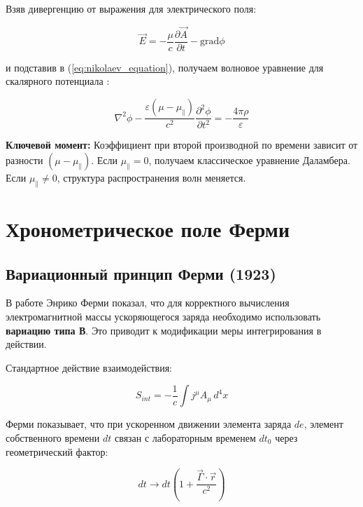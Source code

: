 \documentclass[12pt, a4paper]{article}
\begin{document}
Взяв дивергенцию от выражения для электрического поля:

\begin{equation}
\vec{E} = -\frac{\mu}{c} \frac{\partial \vec{A}}{\partial t} - \text{grad} \phi
\label{eq:electric_field_potentials}
\end{equation}

и подставив в (\ref{eq:nikolaev_equation}), получаем волновое уравнение для скалярного потенциала \cite{NikolaevLorentz}:

\begin{equation}
\nabla^2 \phi - \frac{\varepsilon(\mu - \mu_{\parallel})}{c^2} \frac{\partial^2 \phi}{\partial t^2} = -\frac{4\pi\rho}{\varepsilon}
\label{eq:wave_equation_modified}
\end{equation}

\textbf{Ключевой момент:} Коэффициент при второй производной по времени зависит от разности $(\mu - \mu_{\parallel})$. Если $\mu_{\parallel} = 0$, получаем классическое уравнение Даламбера. Если $\mu_{\parallel} \neq 0$, структура распространения волн меняется.

\section{Хронометрическое поле Ферми}

\subsection{Вариационный принцип Ферми (1923)}

В работе \cite{Fermi1923} Энрико Ферми показал, что для корректного вычисления электромагнитной массы ускоряющегося заряда необходимо использовать \textbf{вариацию типа В}. Это приводит к модификации меры интегрирования в действии.

Стандартное действие взаимодействия:

\begin{equation}
S_{int} = -\frac{1}{c} \int j^\mu A_\mu \, d^4x
\label{eq:action_standard}
\end{equation}

Ферми показывает, что при ускоренном движении элемента заряда $de$, элемент собственного времени $dt$ связан с лабораторным временем $dt_0$ через геометрический фактор:

\begin{equation}
dt \longrightarrow dt \left( 1 + \frac{\vec{\Gamma} \cdot \vec{r}}{c^2} \right)
\label{eq:fermi_correction}
\end{equation}
\end{document}
